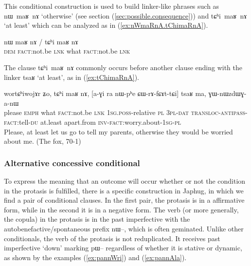 \documentclass[oldfontcommands,oneside,a4paper,11pt]{article}
\newcommand{\ipa}[1]{{\phon \mbox{#1}}} %
\newcommand{\refb}[1]{(\ref{#1})}
\begin{document}
This conditional construction is used to build linker-like phrases such as \ipa{nɯ maʁ nɤ} `otherwise' (see section \refb{sec:possible.consequence}) and \ipa{tɕʰi maʁ nɤ} `at least' which can be analyzed as in \refb{ex:nWmaRnA.tChimaRnA}.
\begin{exe}
\ex  \label{ex:nWmaRnA.tChimaRnA}
\gll
 \ipa{nɯ} \ipa{maʁ} \ipa{nɤ} {              /            } \ipa{tɕʰi}  \ipa{maʁ} \ipa{nɤ} \\
 \textsc{dem} \textsc{fact}:not.be \textsc{lnk} { } what  \textsc{fact}:not.be \textsc{lnk}  \\
\end{exe}

The clause \ipa{tɕʰi maʁ nɤ} commonly occurs before another clause ending with the linker \ipa{tsaʁ} `at least', as in \refb{ex:tChimaRnA}.

\begin{exe}
\ex  \label{ex:tChimaRnA}
\gll
\ipa{wortɕʰiwojɤr} 	\ipa{ʑo,} 	\ipa{tɕʰi} 	\ipa{maʁ} 	\ipa{nɤ,} 	[\ipa{a-ɣi} 	\ipa{ra} 	\ipa{nɯ-pʰe} 	\ipa{ɕɯ-rɤ-fɕɤt-tɕi}] 	\ipa{tsaʁ} 	\ipa{ma,} 	\ipa{ɣɯ-nɯzdɯɣ-a-nɯ} 	 \\
please \textsc{emph} what \textsc{fact}:not.be \textsc{lnk} \textsc{1sg.poss}-relative \textsc{pl} \textsc{3pl-dat} \textsc{transloc-antipass-fact}:tell-\textsc{du} at.least  apart.from \textsc{inv}-\textsc{fact}:worry.about-\textsc{1sg-pl} \\
\glt Please, at least let us go to tell my parents, otherwise they would be worried about me. (The fox, 70-1)
\end{exe}

 
\subsubsection{Alternative concessive conditional}
To express the meaning that an outcome will occur whether or not the condition in the protasis is fulfilled, there is a specific construction in Japhug, in which we find a pair of conditional clauses. In the first pair, the protasis is in a affirmative form, while in the second it is in a negative form. The verb (or more generally, the copula) in the protasis  is in the past imperfective with the autobenefactive/spontaneous prefix \ipa{nɯ--}, which is often geminated. Unlike other conditionals, the verb of the protasis is not reduplicated. It receives past imperfective `down' marking \ipa{pɯ}-- regardless of whether it is stative or dynamic, as shown by the examples \refb{ex:pannWri} and \refb{ex:pannAla}.
\end{document}
